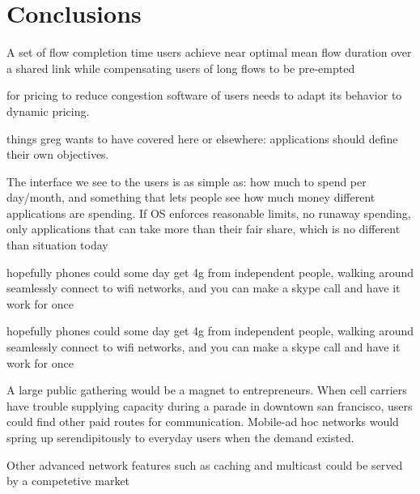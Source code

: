 \section{Conclusions}
A set of flow completion time users achieve near optimal mean flow duration over a shared link while compensating users of long flows to be pre-empted

for pricing to reduce congestion software of users needs to adapt its behavior to dynamic pricing.

things greg wants to have covered here or elsewhere:
applications should define their own objectives.

The interface we see to the users is as simple as: how much to spend per day/month, and something that lets people see how much money different applications are spending. If OS enforces reasonable limits, no runaway spending, only applications that can take more than their fair share, which is no different than situation today

hopefully phones could some day get 4g from independent people, walking around seamlessly connect to wifi networks, and you can make a skype call and have it work for once

hopefully phones could some day get 4g from independent people, walking around seamlessly connect to wifi networks, and you can make a skype call and have it work for once

A large public gathering would be a magnet to entrepreneurs. When cell carriers have trouble supplying capacity during a parade in downtown san francisco, users could find other paid routes for communication. Mobile-ad hoc networks would spring up serendipitously to everyday users when the demand existed.

Other advanced network features such as caching and multicast could be served by a competetive market
\label{sec:conc}
